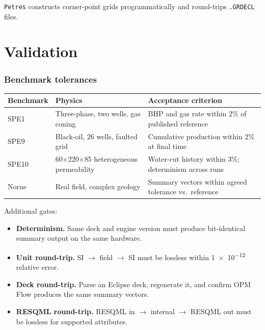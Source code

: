 \documentclass[10pt,a4paper]{article}
\begin{document}
\texttt{Petres} constructs corner-point grids programmatically and round-trips
\texttt{.GRDECL} files.

\part{Validation}

\section{Benchmark tolerances}

\begin{longtable}{@{}p{2.0cm}p{5.4cm}p{6.8cm}@{}}
\toprule
\textbf{Benchmark} & \textbf{Physics} & \textbf{Acceptance criterion}\\
\midrule
\endhead
SPE1  & Three-phase, two wells, gas coning & BHP and gas rate within 2\% of published reference\\
SPE9  & Black-oil, 26 wells, faulted grid & Cumulative production within 2\% at final time\\
SPE10 & 60$\times$220$\times$85 heterogeneous permeability & Water-cut history within 3\%; determinism across runs\\
Norne & Real field, complex geology & Summary vectors within agreed tolerance vs.\ reference\\
\bottomrule
\end{longtable}

\noindent Additional gates:
\begin{itemize}[leftmargin=1.4em]
  \item \textbf{Determinism.} Same deck and engine version must produce
        bit-identical summary output on the same hardware.
  \item \textbf{Unit round-trip.} SI $\rightarrow$ field $\rightarrow$ SI
        must be lossless within \num{1e-12} relative error.
  \item \textbf{Deck round-trip.} Parse an Eclipse deck, regenerate it, and
        confirm OPM Flow produces the same summary vectors.
  \item \textbf{RESQML round-trip.} RESQML in $\rightarrow$ internal $\rightarrow$
        RESQML out must be lossless for supported attributes.
\end{itemize}

\end{document}
